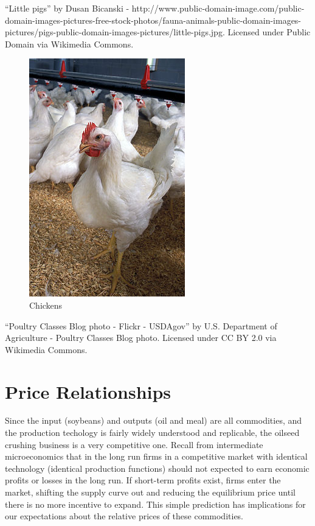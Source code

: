 \documentclass[]{book}
\theoremstyle{definition}
\theoremstyle{definition}
\theoremstyle{remark}
\begin{document}
``Little pigs'' by Dusan Bicanski -
http://www.public-domain-image.com/public-domain-images-pictures-free-stock-photos/fauna-animals-public-domain-images-pictures/pigs-public-domain-images-pictures/little-pigs.jpg.
Licensed under Public Domain via Wikimedia Commons.

\begin{figure}[htbp]
\centering
\includegraphics{images/poultry.jpg}
\caption{Chickens}
\end{figure}

``Poultry Classes Blog photo - Flickr - USDAgov'' by U.S. Department of
Agriculture - Poultry Classes Blog photo. Licensed under CC BY 2.0 via
Wikimedia Commons.

\section{Price Relationships}\label{price-relationships}

Since the input (soybeans) and outputs (oil and meal) are all
commodities, and the production techology is fairly widely understood
and replicable, the oilseed crushing business is a very competitive one.
Recall from intermediate microeconomics that in the long run firms in a
competitive market with identical technology (identical production
functions) should not expected to earn economic profits or losses in the
long run. If short-term profits exist, firms enter the market, shifting
the supply curve out and reducing the equilibrium price until there is
no more incentive to expand. This simple prediction has implications for
our expectations about the relative prices of these commodities.
\end{document}
